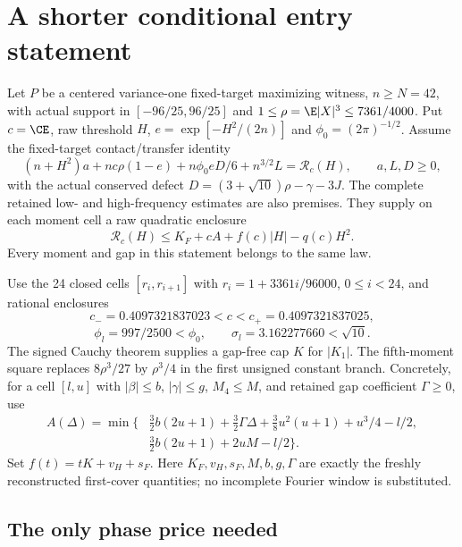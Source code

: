 \section{A shorter conditional entry statement}

Let $P$ be a centered variance-one fixed-target maximizing witness,
$n\ge N=42$, with actual support in $[-96/25,96/25]$ and
$1\le\rho=\E|X|^3\le7361/4000$. Put $c=\CE$, raw threshold $H$,
$e=\exp[-H^2/(2n)]$ and $\phi_0=(2\pi)^{-1/2}$.
Assume the fixed-target contact/transfer identity
\begin{equation}\label{twopass:identity}
 (n+H^2)a+nc\rho(1-e)+n\phi_0 eD/6+n^{3/2}L=\mathcal R_c(H),
 \qquad a,L,D\ge0,
\end{equation}
with the actual conserved defect
$D=(3+\sqrt{10})\rho-\gamma-3J$.
The complete retained low- and high-frequency estimates are also premises.
They supply on each moment cell a raw quadratic enclosure
\begin{equation}\label{twopass:raw}
 \mathcal R_c(H)\le K_F+cA+f(c)|H|-q(c)H^2.
\end{equation}
Every moment and gap in this statement belongs to the same law.

Use the 24 closed cells $[r_i,r_{i+1}]$ with
$r_i=1+3361i/96000$, $0\le i<24$, and rational enclosures
\[
 c_-=0.4097321837023<c<c_+=0.4097321837025,
\]
\[
 \phi_l=997/2500<\phi_0,\qquad
 \sigma_l=3.162277660<\sqrt{10}.
\]
The signed Cauchy theorem supplies a gap-free cap $K$ for $|K_1|$.
The fifth-moment square replaces $8\rho^3/27$ by $\rho^3/4$ in the
first unsigned constant branch. Concretely, for a cell $[l,u]$ with
$|\beta|\le b$, $|\gamma|\le g$, $M_4\le M$, and retained gap coefficient
$\Gamma\ge0$, use
\begin{align*}
 A(\Delta)=\min\bigl\{&\tfrac32b(2u+1)+\tfrac32\Gamma\Delta
       +\tfrac38u^2(u+1)+u^3/4-l/2,\\
                     &\tfrac32b(2u+1)+2uM-l/2\bigr\}.
\end{align*}
Set $f(t)=tK+v_H+s_F$. Here $K_F,v_H,s_F,M,b,g,\Gamma$ are exactly the freshly reconstructed
first-cover quantities; no incomplete Fourier window is substituted.

\subsection{The only phase price needed}

